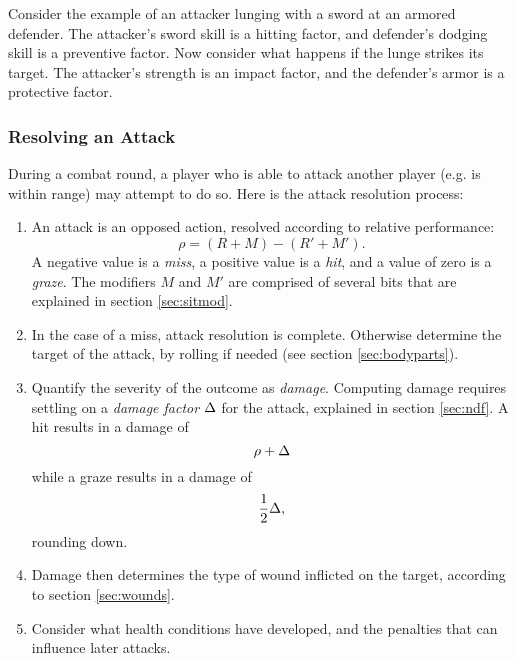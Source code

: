 \documentclass[12pt]{article}
\newcommand{\emdex}[1]{\emph{#1}\index{#1}}
\begin{document}
Consider the example of an attacker lunging with a sword at an armored defender.
The attacker's sword skill is a hitting factor,
and defender's dodging skill is a preventive factor.
Now consider what happens if the lunge strikes its target.
The attacker's strength is an impact factor,
and the defender's armor is a protective factor.


\subsubsection{Resolving an Attack}
During a combat round, a player who is able to attack another player (e.g. is within range) may attempt to do so.
Here is the attack resolution process:
\vspace{-1em}\begin{enumerate}
\item
An attack is an opposed action, resolved according to relative performance:
$$ \rho = (R + M) - (R' + M'). $$
A negative value is a \emdex{miss}, a positive value is a \emdex{hit}, and a value of zero is a \emdex{graze}.
The modifiers $M$ and $M'$ are comprised of several bits that are explained in section \ref{sec:sitmod}.
\item
In the case of a miss, attack resolution is complete.
Otherwise determine the target of the attack, by rolling if needed (see section \ref{sec:bodyparts}).
\item
Quantify the severity of the outcome as \emdex{damage}.
Computing damage requires settling on a \emph{damage factor} $\Delta$ for the attack, explained in section \ref{sec:ndf}.
A hit results in a damage of
$$ \rho + \Delta $$
while a graze results in a damage of
$$ \frac{1}{2} \Delta, $$
rounding down.
\item
Damage then determines the type of wound inflicted on the target, according to section \ref{sec:wounds}.
\item
Consider what health conditions have developed, and the penalties that can influence later attacks.
\end{enumerate}
\end{document}
